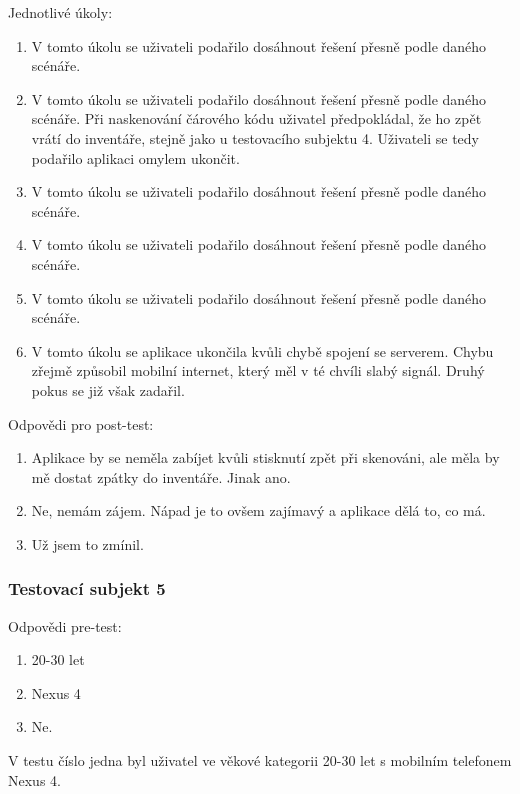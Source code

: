 \documentclass[thesis=B,czech]{FITthesis}[2013/10/20]
\begin{document}
Jednotlivé úkoly:
\begin{enumerate}
  \item V tomto úkolu se uživateli podařilo dosáhnout řešení přesně podle daného scénáře.
  \item V tomto úkolu se uživateli podařilo dosáhnout řešení přesně podle daného scénáře. Při naskenování čárového kódu uživatel předpokládal, že ho zpět vrátí do inventáře, stejně jako u testovacího subjektu 4. Uživateli se tedy podařilo aplikaci omylem ukončit.
  \item V tomto úkolu se uživateli podařilo dosáhnout řešení přesně podle daného scénáře.
  \item V tomto úkolu se uživateli podařilo dosáhnout řešení přesně podle daného scénáře.
  \item V tomto úkolu se uživateli podařilo dosáhnout řešení přesně podle daného scénáře.
  \item V tomto úkolu se aplikace ukončila kvůli chybě spojení se serverem. Chybu zřejmě způsobil mobilní internet, který měl v té chvíli slabý signál. Druhý pokus se již však zadařil.
\end{enumerate}

Odpovědi pro post-test:
\begin{enumerate}
  \item Aplikace by se neměla zabíjet kvůli stisknutí zpět při skenováni, ale měla by mě dostat zpátky do inventáře. Jinak ano.
  \item Ne, nemám zájem. Nápad je to ovšem zajímavý a aplikace dělá to, co má.
  \item Už jsem to zmínil.
\end{enumerate}

\subsubsection{Testovací subjekt 5}

Odpovědi pre-test:

\begin{enumerate}
  \item 20-30 let
  \item Nexus 4
  \item Ne.
\end{enumerate}

V testu číslo jedna byl uživatel ve věkové kategorii 20-30 let s mobilním telefonem Nexus 4.
\end{document}
